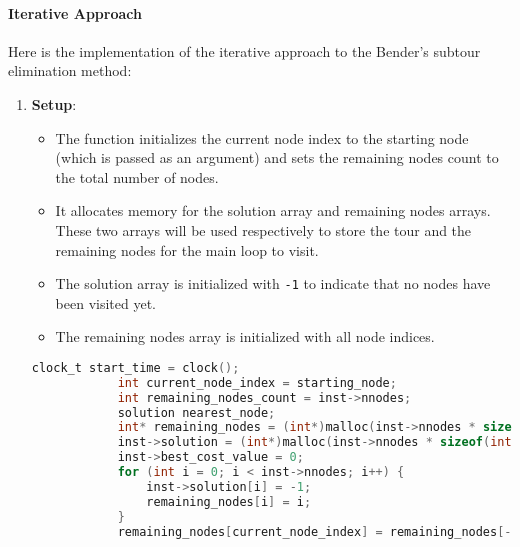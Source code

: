 \documentclass{article}
\begin{document}
\paragraph{Iterative Approach}
Here is the implementation of the iterative approach to the Bender's subtour elimination method:
\begin{enumerate} 
	\item \textbf{Setup}:
	      \begin{itemize}
		      \item The function initializes the current node index to the starting node (which is passed as an argument) 
			  and sets the remaining nodes count to the total number of nodes.
		      \item It allocates memory for the solution array and remaining nodes arrays. These two arrays will be used respectively to store the tour and the remaining nodes for the main loop to visit.
		      \item The solution array is initialized with \texttt{-1} to indicate that no nodes have been visited yet.
		      \item The remaining nodes array is initialized with all node indices.
	      \end{itemize}

		\begin{lstlisting}[language=C]
			clock_t start_time = clock();
			int current_node_index = starting_node;
			int remaining_nodes_count = inst->nnodes;
			solution nearest_node;
			int* remaining_nodes = (int*)malloc(inst->nnodes * sizeof(int));
			inst->solution = (int*)malloc(inst->nnodes * sizeof(int));
			inst->best_cost_value = 0;
			for (int i = 0; i < inst->nnodes; i++) {
				inst->solution[i] = -1;
				remaining_nodes[i] = i;
			}
			remaining_nodes[current_node_index] = remaining_nodes[--remaining_nodes_count];
		\end{lstlisting}


\end{enumerate}
\end{document}
